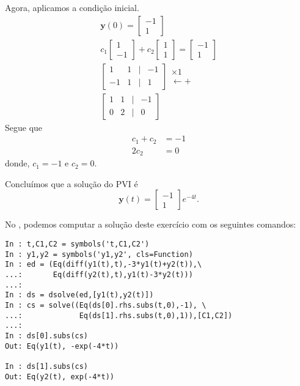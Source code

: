 \begin{resol}
  Agora, aplicamos a condição inicial.
  \begin{gather}
    \pmb{y}(0) =
    \begin{bmatrix}
      -1 \\
      1
    \end{bmatrix}\\
    c_1 \begin{bmatrix}
      1 \\
      -1
    \end{bmatrix} + c_2 \begin{bmatrix}
      1 \\
      1
    \end{bmatrix} =     \begin{bmatrix}
      -1 \\
      1
    \end{bmatrix} \\
    \begin{bmatrix}
      1 & 1 & | & -1 \\
      -1 & 1 & | & 1
    \end{bmatrix}
    \begin{matrix}
      \times 1 \\
      \leftarrow +
    \end{matrix}\\
    \begin{bmatrix}
      1 & 1 & | & -1 \\
      0 & 2 & | & 0
    \end{bmatrix}
  \end{gather}
  Segue que
  \begin{align}
    c_1 + c_2 &= -1\\
    2c_2 &= 0
  \end{align}
  donde, $c_1=-1$ e $c_2 = 0$.

  Concluímos que a solução do PVI é
  \begin{equation}
    \pmb{y}(t) =
    \begin{bmatrix}
      -1 \\
      1
    \end{bmatrix}e^{-4t}.
  \end{equation}

  \ifispython
  No \python, podemos computar a solução deste exercício com os seguintes comandos:
\begin{verbatim}
In : t,C1,C2 = symbols('t,C1,C2')
In : y1,y2 = symbols('y1,y2', cls=Function)
In : ed = (Eq(diff(y1(t),t),-3*y1(t)+y2(t)),\
...:       Eq(diff(y2(t),t),y1(t)-3*y2(t)))
...: 
In : ds = dsolve(ed,[y1(t),y2(t)])
In : cs = solve((Eq(ds[0].rhs.subs(t,0),-1), \
...:             Eq(ds[1].rhs.subs(t,0),1)),[C1,C2])
...: 
In : ds[0].subs(cs)
Out: Eq(y1(t), -exp(-4*t))

In : ds[1].subs(cs)
Out: Eq(y2(t), exp(-4*t))
\end{verbatim}
  \fi
\end{resol}

